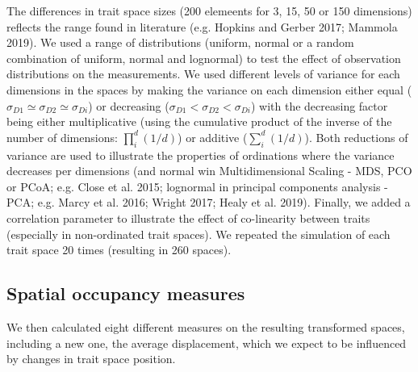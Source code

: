 \documentclass[]{article}
\begin{document}
The differences in trait space sizes (200 elemeents for 3, 15, 50 or 150
dimensions) reflects the range found in literature (e.g. Hopkins and
Gerber 2017; Mammola 2019). We used a range of distributions (uniform,
normal or a random combination of uniform, normal and lognormal) to test
the effect of observation distributions on the measurements. We used
different levels of variance for each dimensions in the spaces by making
the variance on each dimension either equal
(\(\sigma_{D1} \simeq \sigma_{D2} \simeq \sigma_{Di}\)) or decreasing
(\(\sigma_{D1} < \sigma_{D2} < \sigma_{Di}\)) with the decreasing factor
being either multiplicative (using the cumulative product of the inverse
of the number of dimensions: \(\prod_i^d(1/d)\)) or additive
(\(\sum_i^d(1/d)\)). Both reductions of variance are used to illustrate
the properties of ordinations where the variance decreases per
dimensions (and normal win Multidimensional Scaling - MDS, PCO or PCoA;
e.g. Close et al. 2015; lognormal in principal components analysis -
PCA; e.g. Marcy et al. 2016; Wright 2017; Healy et al. 2019). Finally,
we added a correlation parameter to illustrate the effect of
co-linearity between traits (especially in non-ordinated trait spaces).
We repeated the simulation of each trait space 20 times (resulting in
260 spaces).

\subsection{Spatial occupancy
measures}\label{spatial-occupancy-measures}

We then calculated eight different measures on the resulting transformed
spaces, including a new one, the average displacement, which we expect
to be influenced by changes in trait space position.

\renewcommand\baselinestretch{1}\selectfont
\end{document}
